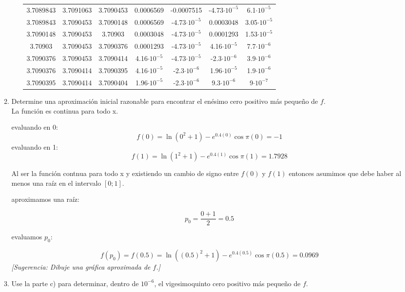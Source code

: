 \documentclass[12pt]{article}
\begin{document}
\begin{enumerate}
\begin{enumerate}
\begin{itemize}
\begin{center}
\begin{tabular}{|c|c|c|c|c|c|c|}
            3.7089843 & 3.7091063 & 3.7090453 & 0.0006569 & -0.0007515 & -4.73\(\cdot 10^{-5}\) & 6.1\(\cdot 10^{-5}\) \\
            3.7089843 & 3.7090453 & 3.7090148 & 0.0006569 & -4.73\(\cdot 10^{-5}\) & 0.0003048 & 3.05\(\cdot 10^{-5}\) \\
            3.7090148 & 3.7090453 & 3.70903 & 0.0003048 & -4.73\(\cdot 10^{-5}\) & 0.0001293 & 1.53\(\cdot 10^{-5}\) \\
            3.70903 & 3.7090453 & 3.7090376 & 0.0001293 & -4.73\(\cdot 10^{-5}\) & 4.16\(\cdot 10^{-5}\) & 7.7\(\cdot 10^{-6}\) \\
            3.7090376 & 3.7090453 & 3.7090414 & 4.16\(\cdot 10^{-5}\) & -4.73\(\cdot 10^{-5}\) & -2.3\(\cdot 10^{-6}\) & 3.9\(\cdot 10^{-6}\) \\
            3.7090376 & 3.7090414 & 3.7090395 & 4.16\(\cdot 10^{-5}\) & -2.3\(\cdot 10^{-6}\) & 1.96\(\cdot 10^{-5}\) & 1.9\(\cdot 10^{-6}\) \\
            3.7090395 & 3.7090414 & 3.7090404 & 1.96\(\cdot 10^{-5}\) & -2.3\(\cdot 10^{-6}\) & 9.3\(\cdot 10^{-6}\) & 9\(\cdot 10^{-7}\) \\
            \hline 
            \end{tabular}
            \end{center}






        \end{itemize}
        \item Determine una aproximación inicial razonable para encontrar el enésimo cero positivo más pequeño de \( f \). \\
        La función es continua para todo x.

        evaluando en 0:
        \[f(0) = \ln(0^2 + 1) - e^{0.4(0)} \cos \pi (0) = -1 \]
        evaluando en 1:
        \[f(1) = \ln(1^2 + 1) - e^{0.4(1)} \cos \pi (1) = 1.7928\]

        Al ser la función contnua para todo x y existiendo un cambio de signo entre \(f(0)\) y \(f(1)\) entonces asumimos que debe haber al menos una raíz en el intervalo \([0;1]\).


        aproximamos una raíz:

        \[p_0 = \frac{0+1}{2} = 0.5\]

        evaluamos \(p_0\):

        \[f(p_0) = f(0.5) = \ln((0.5)^2 + 1) - e^{0.4(0.5)} \cos \pi (0.5) = 0.0969\]
        \textit{[Sugerencia: Dibuje una gráfica aproximada de \( f \).]}
        \item Use la parte c) para determinar, dentro de \(10^{-6}\), el vigesimoquinto cero positivo más pequeño de \( f \).
    

\end{enumerate}
\end{enumerate}
\end{document}
